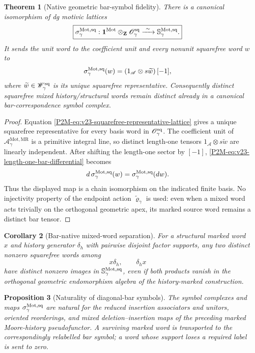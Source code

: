 \documentclass[11pt]{article}
\newtheorem{theorem}{Theorem}[section]
\newtheorem{proposition}[theorem]{Proposition}
\newtheorem{corollary}[theorem]{Corollary}
\theoremstyle{remark}
\newcommand{\Z}{\mathbf Z}
\newcommand{\Mot}{\mathrm{Mot}}
\newcommand{\MR}{\mathrm{MR}}
\begin{document}
\begin{theorem}[Native geometric bar-symbol fidelity]
\label{P2M-thm:v23-native-bar-symbol-fidelity}
There is a canonical isomorphism of dg motivic lattices
\begin{equation}
 \boxed{
 \sigma_\gamma^{\Mot,\rm sq}:
 \mathbf1^{\Mot}\otimes_\Z\mathscr O_\gamma^{\rm sq}
 \xrightarrow{\ \sim\ }
 \mathbb S_\gamma^{\Mot,\rm sq}.}
\end{equation}
It sends the unit word to the coefficient unit and every nonunit squarefree
word \(w\) to
\[
 \sigma_\gamma^{\Mot,\rm sq}(w)
 =
 \left(1_{\mathscr A}\otimes s\widetilde w\right)[-1],
\]
where \(\widetilde w\in\mathscr W_\gamma^{\rm sq}\) is its unique squarefree
representative.  Consequently distinct squarefree mixed
history/structural words remain distinct already in a canonical
bar-correspondence symbol complex.
\end{theorem}

\begin{proof}
Equation \eqref{P2M-eq:v23-squarefree-representative-lattice} gives a unique
squarefree representative for every basis word in
\(\mathscr O_\gamma^{\rm sq}\).  The coefficient unit of
\(\mathscr A_\gamma^{\Mot,\MR}\) is a primitive integral line, so distinct
length-one tensors \(1_{\mathscr A}\otimes s\widetilde w\) are linearly
independent.  After shifting the length-one sector by \([-1]\),
\eqref{P2M-eq:v23-length-one-bar-differential} becomes
\[
 d\,\sigma_\gamma^{\Mot,\rm sq}(w)
 =
 \sigma_\gamma^{\Mot,\rm sq}(dw).
\]
Thus the displayed map is a chain isomorphism on the indicated finite basis.
No injectivity property of the endpoint action
\(\widetilde\varrho_\gamma\) is used: even when a mixed word acts trivially on
the orthogonal geometric apex, its marked source word remains a distinct bar
tensor.
\end{proof}

\begin{corollary}[Bar-native mixed-word separation]
\label{P2M-cor:v23-bar-native-mixed-word-separation}
For a structural marked word \(x\) and history generator \(\delta_h\) with
pairwise disjoint factor supports, any two distinct nonzero squarefree words
among
\[
 x\delta_h,\qquad \delta_hx
\]
have distinct nonzero images in
\(\mathbb S_\gamma^{\Mot,\rm sq}\), even if both products vanish in the
orthogonal geometric endomorphism algebra of the history-marked construction.
\end{corollary}

\begin{proposition}[Naturality of diagonal-bar symbols]
\label{P2M-prop:v23-bar-symbol-naturality}
The symbol complexes and maps
\(\sigma_\gamma^{\Mot,\rm sq}\) are natural for the reduced insertion
associators and unitors, oriented reorderings, and mixed
deletion--insertion maps of the preceding marked Moore-history pseudofunctor.
A surviving marked word is transported to the correspondingly relabelled bar
symbol; a word whose support loses a required label is sent to zero.
\end{proposition}
\end{document}
